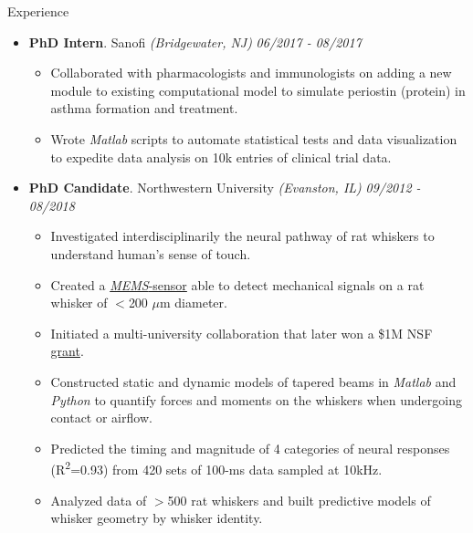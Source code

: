 \documentclass{resume} %
\begin{document}
\begin{rSection}{Experience}
\begin{itemize}[leftmargin=0em]
			\item {\bf PhD Intern}{. Sanofi \textit{(Bridgewater, NJ)}} \hfill {\em 06/2017 - 08/2017}\\
			\vspace{-5mm}
			\begin{itemize}
				\setlength\itemsep{-1.75em}	
				\item Collaborated with pharmacologists and immunologists on adding a new module to existing computational model to simulate periostin (protein) in asthma formation and treatment.\\
				\item Wrote \textit{Matlab} scripts to automate statistical tests and data visualization to expedite data analysis on 10k entries of clinical trial data.
			\end{itemize}
			
			\item {\bf PhD Candidate}{. Northwestern University \textit{(Evanston, IL)}} \hfill {\em 09/2012 - 08/2018}\\
			\vspace{-5mm}
			\begin{itemize}
				\setlength\itemsep{-1.75em}
				\item Investigated interdisciplinarily the neural pathway of rat whiskers to understand human's sense of touch.\\
				\item Created a \href{https://www.youtube.com/watch?v=EPuThXPd-qw}{\textit{MEMS}-sensor} able to detect mechanical signals on a rat whisker of $<$200 $\mu$m diameter.\\
				\item Initiated a multi-university collaboration that later won a \$1M NSF \href{https://www.nsf.gov/news/mmg/mmg_disp.jsp?med_id=132588}{grant}.\\
				\item Constructed static and dynamic models of tapered beams in \textit{Matlab} and \textit{Python} to quantify forces and moments on the whiskers when undergoing contact or airflow.\\
				\item Predicted the timing and magnitude of 4 categories of neural responses (R\textsuperscript{2}=0.93) from 420 sets of 100-ms data sampled at 10kHz.\\
				\item Analyzed data of $>$500 rat whiskers and built predictive models of whisker geometry by whisker identity.	
			\end{itemize}
			
			
		\end{itemize}
		
	\end{rSection}
	
\end{document}
